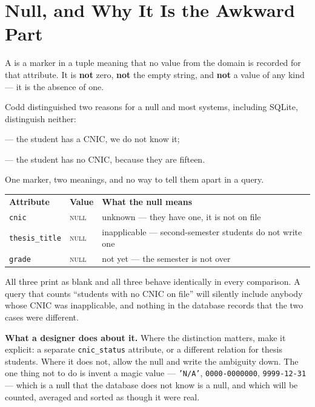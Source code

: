 \section{Null, and Why It Is the Awkward Part}

\begin{definitionbox}[Null]
A  is a marker in a tuple meaning that no value from the domain is
recorded for that attribute. It is \textbf{not} zero, \textbf{not} the empty
string, and \textbf{not} a value of any kind --- it is the absence of one.

\smallskip
Codd distinguished two reasons for a null and most systems, including SQLite,
distinguish neither:
\begin{tight}
  \item {} --- the student has a CNIC, we do not know it;
  \item {} --- the student has no CNIC, because they are
        fifteen.
\end{tight}
One marker, two meanings, and no way to tell them apart in a query.
\end{definitionbox}

\begin{examplebox}
\begin{tabular}{@{}L{2.9cm}L{3.4cm}L{7.6cm}@{}}
\textbf{Attribute} & \textbf{Value} & \textbf{What the null means} \\
\texttt{cnic}        & \textsc{null} & unknown --- they have one, it is not on file \\
\texttt{thesis\_title} & \textsc{null} & inapplicable --- second-semester
                                        students do not write one \\
\texttt{grade}       & \textsc{null} & not yet --- the semester is not over \\
\end{tabular}

\smallskip
All three print as blank and all three behave identically in every comparison.
A query that counts ``students with no CNIC on file'' will silently include
anybody whose CNIC was inapplicable, and nothing in the database records that
the two cases were different.

\smallskip
\textbf{What a designer does about it.} Where the distinction matters, make it
explicit: a separate \texttt{cnic\_status} attribute, or a different relation
for thesis students. Where it does not, allow the null and write the ambiguity
down. The one thing not to do is invent a magic value --- \texttt{'N/A'},
\texttt{0000-0000000}, \texttt{9999-12-31} --- which is a null that the
database does not know is a null, and which will be counted, averaged and
sorted as though it were real.
\end{examplebox}

